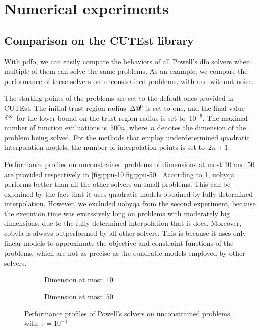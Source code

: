 
\section{Numerical experiments}
\label{sec:pdfo-experiments}

\subsection{Comparison on the CUTEst library}

With \gls{pdfo}, we can easily compare the behaviors of all Powell's \gls{dfo} solvers when multiple of them can solve the same problems.
As an example, we compare the performance of these solvers on unconstrained problems, with and without noise.

The starting points of the problems are set to the default ones provided in CUTEst.
The initial trust-region radius~$\rad[0]$ is set to one, and the final value~$\radlb[\infty]$ for the lower bound on the trust-region radius is set to~$10^{-6}$.
The maximal number of function evaluations is~$500n$, where~$n$ denotes the dimension of the problem being solved.
For the methods that employ underdetermined quadratic interpolation models, the number of interpolation points is set to~$2n + 1$.

Performance profiles on unconstrained problems of dimensions at most \num{10} and \num{50} are provided respectively in \cref{fig:ppu-10,fig:ppu-50}.
According to \cref{fig:ppu-10}, \gls{uobyqa} performs better than all the other solvers on small problems.
This can be explained by the fact that it uses quadratic models obtained by fully-determined interpolation.
However, we excluded \gls{uobyqa} from the second experiment, because the execution time was excessively long on problems with moderately big dimensions, due to the fully-determined interpolation that it does.
Moreover, \gls{cobyla} is always outperformed by all other solvers.
This is because it uses only linear models to approximate the objective and constraint functions of the problems, which are not as precise as the quadratic models employed by other solvers.

\begin{figure}[ht]
    \begin{subfigure}[b]{0.49\textwidth}
        \centering
        \caption{Dimension at most~$10$}
        \label{fig:ppu-10}
    \end{subfigure}
    \hfill
    \begin{subfigure}[b]{0.49\textwidth}
        \centering
        \caption{Dimension at most~$50$}
        \label{fig:ppu-50}
    \end{subfigure}
    \caption[Performance profiles of Powell's  solvers]{Performance profiles of Powell's  solvers on unconstrained problems with~$\tau = 10^{-4}$}
\end{figure}

